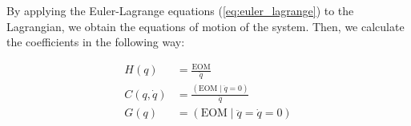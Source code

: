 By applying the Euler-Lagrange equations (\ref{eq:euler_lagrange}) to the Lagrangian, we obtain the equations of motion of the system.
Then, we calculate the coefficients in the following way:

\begin{equation}\label{eq:coefficients_eom}
    \begin{split}
        H(q) &= \frac{\text{EOM}}{\ddot{q}}\\
        C(q, \dot{q}) &= \frac{(\text{EOM}\;|\;\ddot{q} = 0)}{\dot{q}}\\
        G(q) &= (\text{EOM}\;|\;\ddot{q} = \dot{q} = 0)
    \end{split}
\end{equation}

